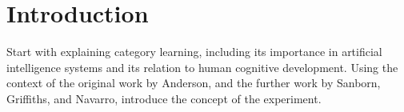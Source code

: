 \section*{Introduction}

Start with explaining category learning, including its importance in artificial
intelligence systems and its relation to human cognitive development. Using the
context of the original work by Anderson, and the further work by Sanborn,
Griffiths, and Navarro, introduce the concept of the experiment.
